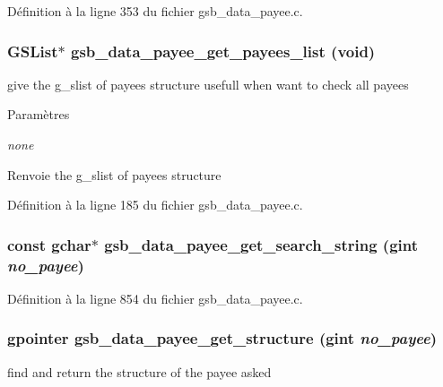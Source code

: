 Définition à la ligne 353 du fichier gsb\_\-data\_\-payee.c.

\subsubsection[{gsb\_\-data\_\-payee\_\-get\_\-payees\_\-list}]{\setlength{\rightskip}{0pt plus 5cm}GSList$\ast$ gsb\_\-data\_\-payee\_\-get\_\-payees\_\-list (void)}\label{gsb__data__payee_8h_a2fe0b4b22dcae74be865456e5f7c9995}
give the g\_\-slist of payees structure usefull when want to check all payees


\begin{DoxyParams}{Paramètres}
\item[{\em none}]\end{DoxyParams}
\begin{DoxyReturn}{Renvoie}
the g\_\-slist of payees structure 
\end{DoxyReturn}


Définition à la ligne 185 du fichier gsb\_\-data\_\-payee.c.

\subsubsection[{gsb\_\-data\_\-payee\_\-get\_\-search\_\-string}]{\setlength{\rightskip}{0pt plus 5cm}const gchar$\ast$ gsb\_\-data\_\-payee\_\-get\_\-search\_\-string (gint {\em no\_\-payee})}\label{gsb__data__payee_8h_a8162f3417a19a1fff59c24b47c28e891}


Définition à la ligne 854 du fichier gsb\_\-data\_\-payee.c.

\subsubsection[{gsb\_\-data\_\-payee\_\-get\_\-structure}]{\setlength{\rightskip}{0pt plus 5cm}gpointer gsb\_\-data\_\-payee\_\-get\_\-structure (gint {\em no\_\-payee})}\label{gsb__data__payee_8h_a6e682c7bfd8d88b7136512fe2679a24b}
find and return the structure of the payee asked


